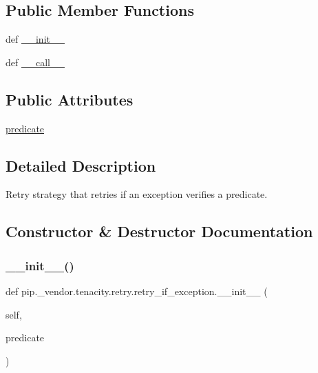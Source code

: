 \subsection*{Public Member Functions}
\begin{DoxyCompactItemize}
\item 
def \hyperlink{classpip_1_1__vendor_1_1tenacity_1_1retry_1_1retry__if__exception_a18fa9073344f168df54ddf40a84d8584}{\+\_\+\+\_\+init\+\_\+\+\_\+}
\item 
def \hyperlink{classpip_1_1__vendor_1_1tenacity_1_1retry_1_1retry__if__exception_a20b73c462e2b3d72aaca71eb28a683e4}{\+\_\+\+\_\+call\+\_\+\+\_\+}
\end{DoxyCompactItemize}
\subsection*{Public Attributes}
\begin{DoxyCompactItemize}
\item 
\hyperlink{classpip_1_1__vendor_1_1tenacity_1_1retry_1_1retry__if__exception_a45770923ddba8e8f2ecd677f5502447b}{predicate}
\end{DoxyCompactItemize}


\subsection{Detailed Description}
\begin{DoxyVerb}Retry strategy that retries if an exception verifies a predicate.\end{DoxyVerb}
 

\subsection{Constructor \& Destructor Documentation}
\mbox{\label{classpip_1_1__vendor_1_1tenacity_1_1retry_1_1retry__if__exception_a18fa9073344f168df54ddf40a84d8584}} 
\subsubsection{\texorpdfstring{\+\_\+\+\_\+init\+\_\+\+\_\+()}{\_\_init\_\_()}}
{\footnotesize\ttfamily def pip.\+\_\+vendor.\+tenacity.\+retry.\+retry\+\_\+if\+\_\+exception.\+\_\+\+\_\+init\+\_\+\+\_\+ (\begin{DoxyParamCaption}\item[{}]{self,  }\item[{}]{predicate }\end{DoxyParamCaption})}



